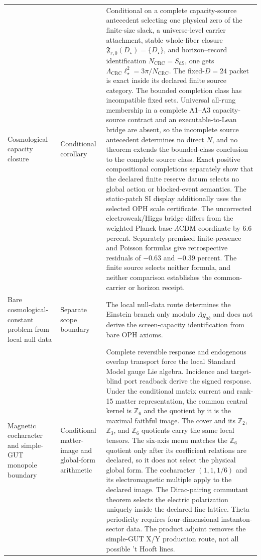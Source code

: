 \begin{longtable}{@{}>{\raggedright\arraybackslash}p{}>{\raggedright\arraybackslash}p{}>{\raggedright\arraybackslash}p{}@{}}
Cosmological-capacity closure & Conditional corollary & Conditional on a complete capacity-source antecedent selecting one physical zero of the finite-size slack, a universe-level carrier attachment, stable whole-fiber closure \(\mathfrak F_{r,0}(D_\star)=\{D_\star\}\), and horizon--record identification \(N_{\mathrm{CRC}}=S_{\mathrm{dS}}\), one gets \(\Lambda_{\mathrm{CRC}}\ell_\star^2=3\pi/N_{\mathrm{CRC}}\). The fixed-\(D=24\) packet is exact inside its declared finite source category. The bounded completion class has incompatible fixed sets. Universal all-rung membership in a complete A1--A3 capacity-source contract and an executable-to-Lean bridge are absent, so the incomplete source antecedent determines no direct \(N\), and no theorem extends the bounded-class conclusion to the complete source class. Exact positive compositional completions separately show that the declared finite reserve datum selects no global action or blocked-event semantics. The static-patch SI display additionally uses the selected OPH scale certificate. The uncorrected electroweak/Higgs bridge differs from the weighted Planck base-\(\Lambda\)CDM coordinate by \(6.6\) percent. Separately premised finite-presence and Poisson formulas give retrospective residuals of \(-0.63\) and \(-0.39\) percent. The finite source selects neither formula, and neither comparison establishes the common-carrier or horizon receipt. \\
Bare cosmological-constant problem from local null data & Separate scope boundary & The local null-data route determines the Einstein branch only modulo \(\Lambda g_{ab}\) and does not derive the screen-capacity identification from bare OPH axioms. \\
Magnetic cocharacter and simple-GUT monopole boundary & Conditional matter-image and global-form arithmetic & Complete reversible response and endogenous overlap transport force the local Standard Model gauge Lie algebra. Incidence and target-blind port readback derive the signed response. Under the conditional matrix current and rank-15 matter representation, the common central kernel is \(\mathbb Z_6\) and the quotient by it is the maximal faithful image. The cover and its \(\mathbb Z_2\), \(\mathbb Z_3\), and \(\mathbb Z_6\) quotients carry the same local tensors. The six-axis menu matches the \(\mathbb Z_6\) quotient only after its coefficient relations are declared, so it does not select the physical global form. The cocharacter \((1,1,1/6)\) and its electromagnetic multiple apply to the declared image. The Dirac-pairing commutant theorem selects the electric polarization uniquely inside the declared line lattice. Theta periodicity requires four-dimensional instanton-sector data. The product adjoint removes the simple-GUT X/Y production route, not all possible 't Hooft lines. \\

\end{longtable}
